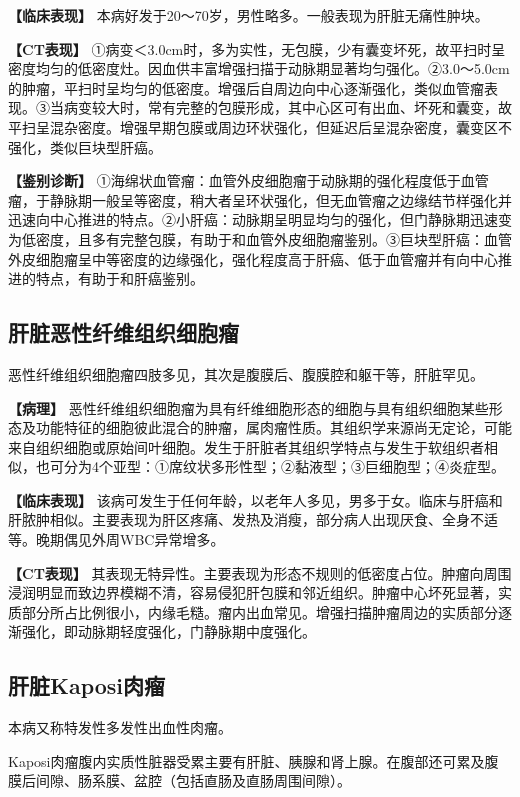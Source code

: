 \textbf{【临床表现】}
本病好发于20～70岁，男性略多。一般表现为肝脏无痛性肿块。

\textbf{【CT表现】}
①病变＜3.0cm时，多为实性，无包膜，少有囊变坏死，故平扫时呈密度均匀的低密度灶。因血供丰富增强扫描于动脉期显著均匀强化。②3.0～5.0cm的肿瘤，平扫时呈均匀的低密度。增强后自周边向中心逐渐强化，类似血管瘤表现。③当病变较大时，常有完整的包膜形成，其中心区可有出血、坏死和囊变，故平扫呈混杂密度。增强早期包膜或周边环状强化，但延迟后呈混杂密度，囊变区不强化，类似巨块型肝癌。

\textbf{【鉴别诊断】}
①海绵状血管瘤：血管外皮细胞瘤于动脉期的强化程度低于血管瘤，于静脉期一般呈等密度，稍大者呈环状强化，但无血管瘤之边缘结节样强化并迅速向中心推进的特点。②小肝癌：动脉期呈明显均匀的强化，但门静脉期迅速变为低密度，且多有完整包膜，有助于和血管外皮细胞瘤鉴别。③巨块型肝癌：血管外皮细胞瘤呈中等密度的边缘强化，强化程度高于肝癌、低于血管瘤并有向中心推进的特点，有助于和肝癌鉴别。

\subsection{肝脏恶性纤维组织细胞瘤}

恶性纤维组织细胞瘤四肢多见，其次是腹膜后、腹膜腔和躯干等，肝脏罕见。

\textbf{【病理】}
恶性纤维组织细胞瘤为具有纤维细胞形态的细胞与具有组织细胞某些形态及功能特征的细胞彼此混合的肿瘤，属肉瘤性质。其组织学来源尚无定论，可能来自组织细胞或原始间叶细胞。发生于肝脏者其组织学特点与发生于软组织者相似，也可分为4个亚型：①席纹状多形性型；②黏液型；③巨细胞型；④炎症型。

\textbf{【临床表现】}
该病可发生于任何年龄，以老年人多见，男多于女。临床与肝癌和肝脓肿相似。主要表现为肝区疼痛、发热及消瘦，部分病人出现厌食、全身不适等。晚期偶见外周WBC异常增多。

\textbf{【CT表现】}
其表现无特异性。主要表现为形态不规则的低密度占位。肿瘤向周围浸润明显而致边界模糊不清，容易侵犯肝包膜和邻近组织。肿瘤中心坏死显著，实质部分所占比例很小，内缘毛糙。瘤内出血常见。增强扫描肿瘤周边的实质部分逐渐强化，即动脉期轻度强化，门静脉期中度强化。

\subsection{肝脏Kaposi肉瘤}

本病又称特发性多发性出血性肉瘤。

Kaposi肉瘤腹内实质性脏器受累主要有肝脏、胰腺和肾上腺。在腹部还可累及腹膜后间隙、肠系膜、盆腔（包括直肠及直肠周围间隙）。

